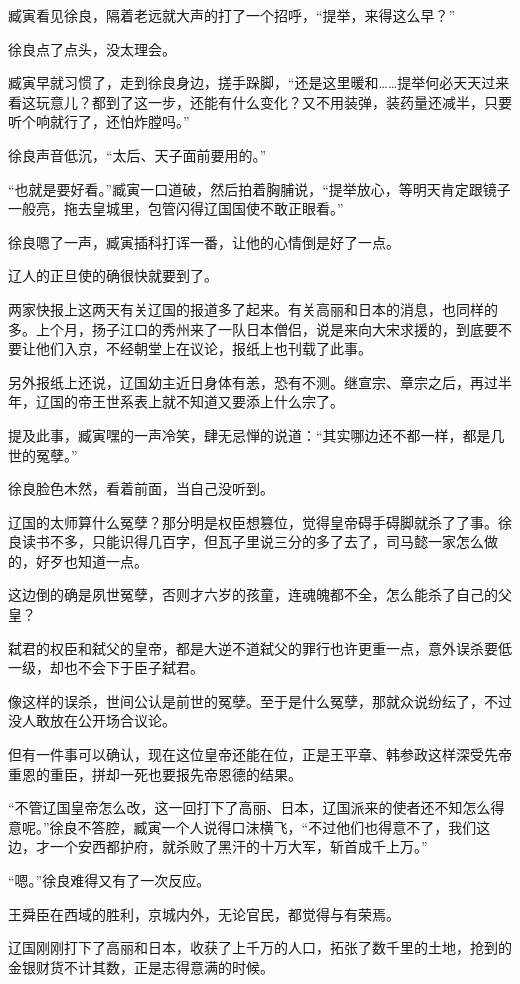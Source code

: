 臧寅看见徐良，隔着老远就大声的打了一个招呼，“提举，来得这么早？”

徐良点了点头，没太理会。

臧寅早就习惯了，走到徐良身边，搓手跺脚，“还是这里暖和……提举何必天天过来看这玩意儿？都到了这一步，还能有什么变化？又不用装弹，装药量还减半，只要听个响就行了，还怕炸膛吗。”

徐良声音低沉，“太后、天子面前要用的。”

“也就是要好看。”臧寅一口道破，然后拍着胸脯说，“提举放心，等明天肯定跟镜子一般亮，拖去皇城里，包管闪得辽国国使不敢正眼看。”

徐良嗯了一声，臧寅插科打诨一番，让他的心情倒是好了一点。

辽人的正旦使的确很快就要到了。

两家快报上这两天有关辽国的报道多了起来。有关高丽和日本的消息，也同样的多。上个月，扬子江口的秀州来了一队日本僧侣，说是来向大宋求援的，到底要不要让他们入京，不经朝堂上在议论，报纸上也刊载了此事。

另外报纸上还说，辽国幼主近日身体有恙，恐有不测。继宣宗、章宗之后，再过半年，辽国的帝王世系表上就不知道又要添上什么宗了。

提及此事，臧寅嘿的一声冷笑，肆无忌惮的说道：“其实哪边还不都一样，都是几世的冤孽。”

徐良脸色木然，看着前面，当自己没听到。

辽国的太师算什么冤孽？那分明是权臣想篡位，觉得皇帝碍手碍脚就杀了了事。徐良读书不多，只能识得几百字，但瓦子里说三分的多了去了，司马懿一家怎么做的，好歹也知道一点。

这边倒的确是夙世冤孽，否则才六岁的孩童，连魂魄都不全，怎么能杀了自己的父皇？

弑君的权臣和弑父的皇帝，都是大逆不道弑父的罪行也许更重一点，意外误杀要低一级，却也不会下于臣子弑君。

像这样的误杀，世间公认是前世的冤孽。至于是什么冤孽，那就众说纷纭了，不过没人敢放在公开场合议论。

但有一件事可以确认，现在这位皇帝还能在位，正是王平章、韩参政这样深受先帝重恩的重臣，拼却一死也要报先帝恩德的结果。

“不管辽国皇帝怎么改，这一回打下了高丽、日本，辽国派来的使者还不知怎么得意呢。”徐良不答腔，臧寅一个人说得口沫横飞，“不过他们也得意不了，我们这边，才一个安西都护府，就杀败了黑汗的十万大军，斩首成千上万。”

“嗯。”徐良难得又有了一次反应。

王舜臣在西域的胜利，京城内外，无论官民，都觉得与有荣焉。

辽国刚刚打下了高丽和日本，收获了上千万的人口，拓张了数千里的土地，抢到的金银财货不计其数，正是志得意满的时候。

